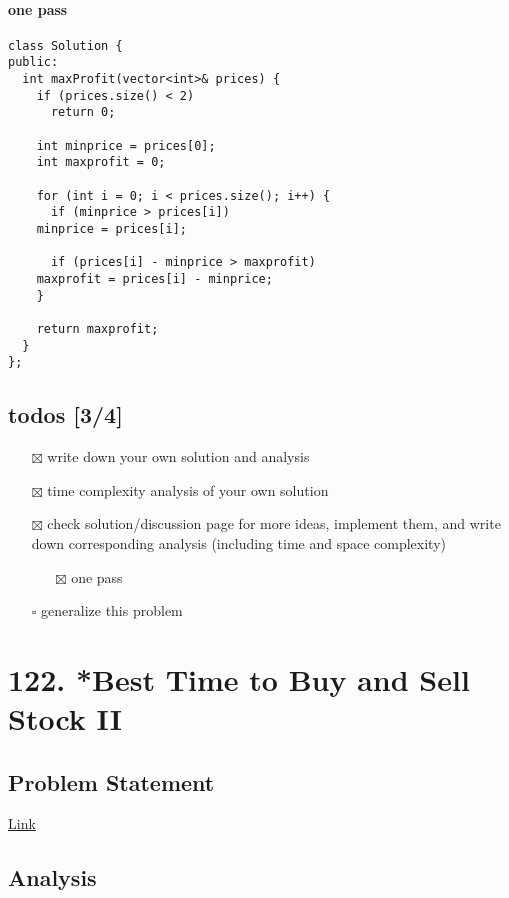 \documentclass[12pt]{article}
\begin{document}
\paragraph{one pass}
\label{sec:org8e3eea1}
\begin{verbatim}
class Solution {
public:
  int maxProfit(vector<int>& prices) {
    if (prices.size() < 2)
      return 0;

    int minprice = prices[0];
    int maxprofit = 0;

    for (int i = 0; i < prices.size(); i++) {
      if (minprice > prices[i])
	minprice = prices[i];

      if (prices[i] - minprice > maxprofit)
	maxprofit = prices[i] - minprice;
    }

    return maxprofit;
  }
};
\end{verbatim}
\subsection{todos [3/4]}
\label{sec:orgdd34d74}
\begin{itemize}
\item[{$\boxtimes$}] write down your own solution and analysis
\item[{$\boxtimes$}] time complexity analysis of your own solution
\item[{$\boxtimes$}] check solution/discussion page for more ideas, implement them, and write down corresponding analysis (including time and space complexity)
\begin{itemize}
\item[{$\boxtimes$}] one pass
\end{itemize}
\item[{$\square$}] generalize this problem
\end{itemize}
\section{122. *Best Time to Buy and Sell Stock II \label{org6c7ca3c}}
\label{sec:org3d8584e}
\subsection{Problem Statement}
\label{sec:org12bd81d}
\href{https://leetcode.com/problems/best-time-to-buy-and-sell-stock-ii/}{Link}
\subsection{Analysis}
\label{sec:org207f2da}
\end{document}
